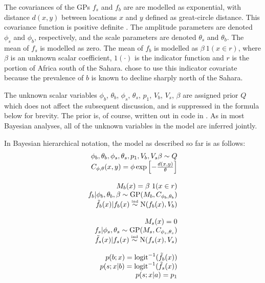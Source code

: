 \documentclass[article]{jss}
\begin{document}
The covariances of the GPs $f_s$ and $f_b$ are are modelled as exponential, with distance $d(x,y)$ between locations $x$ and $y$ defined as great-circle distance. This covariance function is positive definite \citep{spherical-validity}. The amplitude parameters are denoted $\phi_s$ and $\phi_b$, respectively, and the scale parameters are denoted $\theta_s$ and $\theta_b$. The mean of $f_s$ is modelled as zero. The mean of $f_b$ is modelled as $\beta\ 1(x\in r)$, where $\beta$ is an unknown scalar coefficient, $1(\cdot)$ is the indicator function and $r$ is the portion of Africa south of the Sahara. \cite{Howes} chose to use this indicator covariate because the prevalence of $b$ is known to decline sharply north of the Sahara.

The unknown scalar variables $\phi_b$, $\theta_b$, $\phi_s$, $\theta_s$, $p_1$, $V_b$, $V_s$, $\beta$ are assigned prior $Q$ which does not affect the subsequent discussion, and is suppressed in the formula below for brevity. The prior is, of course, written out in code in . As in most Bayesian analyses, all of the unknown variables in the model are inferred jointly. 

In Bayesian hierarchical notation, the model as described so far is as follows:
\begin{equation}
    \label{eq:duffy-model} 
    \begin{array}{r}
        \phi_b,\theta_b,\phi_s,\theta_s,p_1,V_b,V_s\beta\sim Q\\
        C_{\phi,\theta}(x,y)=\phi\exp\left[{-\frac{d(x,y)}{\theta}}\right]\\\\
        M_b(x) = \beta\ 1(x\in r)\\
        f_b|\phi_b,\theta_b,\beta\sim \textup{GP}(M_b, C_{\phi_b,\theta_b}) \\
        \tilde f_b(x) | f_b(x) \stackrel{\textup{\tiny ind}}{\sim} \textup{N}(f_b(x),V_b) \\\\
        M_s(x) = 0\\
        f_s|\phi_s,\theta_s\sim \textup{GP}(M_s, C_{\phi_s,\theta_s})\\
        \tilde f_s(x) | f_s(x) \stackrel{\textup{\tiny ind}}{\sim} \textup{N}(f_s(x),V_s)\\\\
        p(b;x) = \textup{logit}^{-1}(\tilde f_b(x))\\
        p(s;x|b)= \textup{logit}^{-1}(\tilde f_s(x))\\
        p(s;x|a)= p_1
    \end{array}
\end{equation}  
\end{document}
